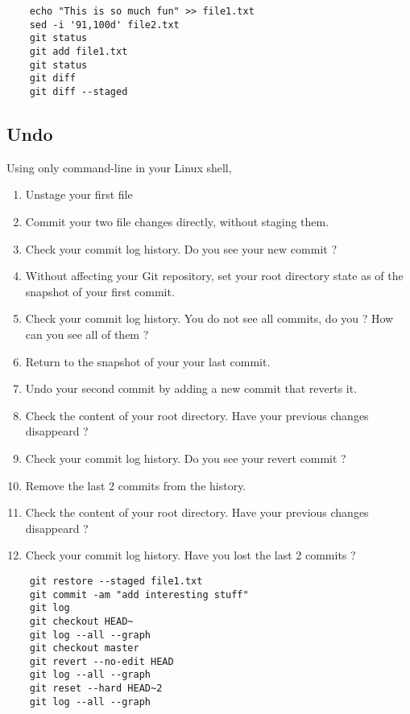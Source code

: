 \ifdefined\answer
\begin{verbatim}
    echo "This is so much fun" >> file1.txt
    sed -i '91,100d' file2.txt
    git status
    git add file1.txt
    git status
    git diff
    git diff --staged
\end{verbatim}
\fi

\subsection{Undo}  %

Using only command-line in your Linux shell,
\begin{enumerate}
    \item Unstage your first file
    \item Commit your two file changes directly, without staging them.
    \item Check your commit log history. Do you see your new commit ?
    \item Without affecting your Git repository, set your root directory state
          as of the snapshot of your first commit.
    \item Check your commit log history. You do not see all commits, do you ? How can you see all of them ?
    \item Return to the snapshot of your your last commit.
    \item Undo your second commit by adding a new commit that reverts it.
    \item Check the content of your root directory. Have your previous changes disappeard ?
    \item Check your commit log history. Do you see your revert commit ?
    \item Remove the last 2 commits from the history.
    \item Check the content of your root directory. Have your previous changes disappeard ?
    \item Check your commit log history. Have you lost the last 2 commits ?
\end{enumerate}

\ifdefined\answer
\begin{verbatim}
    git restore --staged file1.txt
    git commit -am "add interesting stuff"
    git log
    git checkout HEAD~
    git log --all --graph
    git checkout master
    git revert --no-edit HEAD
    git log --all --graph
    git reset --hard HEAD~2
    git log --all --graph
\end{verbatim}
\fi

